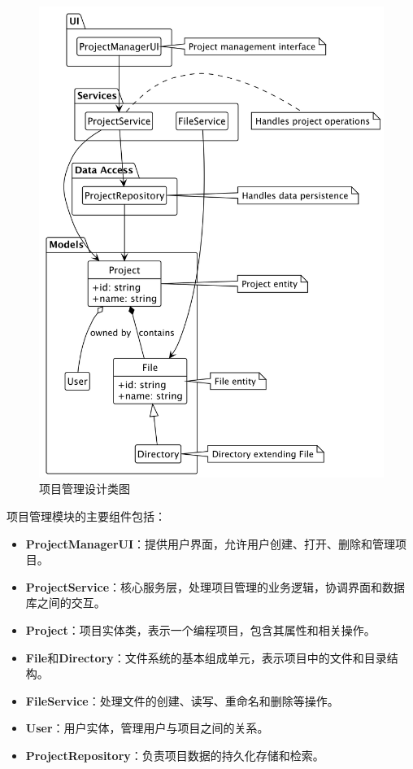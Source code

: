 \documentclass[
    report,     %
    oneside,    %
    UTF8,       %
    zihao=-4    %
]{config} %
\begin{document}
\begin{figure}[H]
    \centering
    \includegraphics[width=1.0\textwidth]{UML/ProjectManagementClass.png}
    \caption{项目管理设计类图}
    \label{fig:project-management-class}
\end{figure}

项目管理模块的主要组件包括：

\begin{itemize}
    \item \textbf{ProjectManagerUI}：提供用户界面，允许用户创建、打开、删除和管理项目。
    \item \textbf{ProjectService}：核心服务层，处理项目管理的业务逻辑，协调界面和数据库之间的交互。
    \item \textbf{Project}：项目实体类，表示一个编程项目，包含其属性和相关操作。
    \item \textbf{File}和\textbf{Directory}：文件系统的基本组成单元，表示项目中的文件和目录结构。
    \item \textbf{FileService}：处理文件的创建、读写、重命名和删除等操作。
    \item \textbf{User}：用户实体，管理用户与项目之间的关系。
    \item \textbf{ProjectRepository}：负责项目数据的持久化存储和检索。
\end{itemize}
\end{document}
